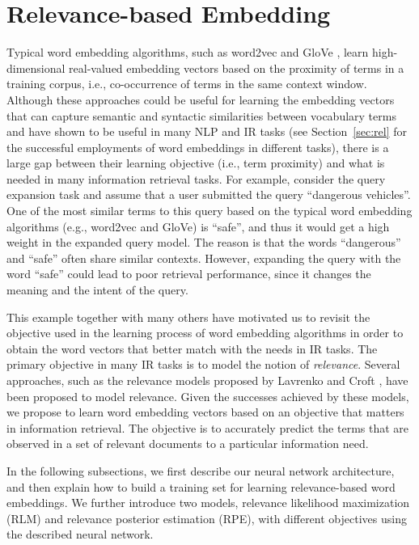 \documentclass[sigconf]{acmart}
\begin{document}
\vspace{-0.3cm}
\section{Relevance-based Embedding}
\label{sec:method}

Typical word embedding algorithms, such as word2vec \cite{Mikolov:2013} and GloVe \cite{Pennington:2014}, learn high-dimensional real-valued embedding vectors based on the proximity of terms in a training corpus, i.e., co-occurrence of terms in the same context window. Although these approaches could be useful for learning the embedding vectors that can capture semantic and syntactic similarities between vocabulary terms and have shown to be useful in many NLP and IR tasks (see Section~\ref{sec:rel} for the successful employments of word embeddings in different tasks), there is a large gap between their learning objective (i.e., term proximity) and what is needed in many information retrieval tasks. For example, consider the query expansion task and assume that a user submitted the query ``dangerous vehicles''. One of the most similar terms to this query based on the typical word embedding algorithms (e.g., word2vec and GloVe) is ``safe'', and thus it would get a high weight in the expanded query model. The reason is that the words ``dangerous'' and ``safe'' often share similar contexts. However, expanding the query with the word ``safe'' could lead to poor retrieval performance, since it changes the meaning and the intent of the query.

This example together with many others have motivated us to revisit the objective used in the learning process of word embedding algorithms in order to obtain the word vectors that better match with the needs in IR tasks. The primary objective in many IR tasks is to model the notion of \textit{relevance}. Several approaches, such as the relevance models proposed by Lavrenko and Croft \cite{Lavrenko:2001}, have been proposed to model relevance. Given the successes achieved by these models, we propose to learn word embedding vectors based on an objective that matters in information retrieval. The objective is to accurately predict the terms that are observed in a set of relevant documents to a particular information need. 

In the following subsections, we first describe our neural network architecture, and then explain how to build a training set for learning relevance-based word embeddings. We further introduce two models, relevance likelihood maximization (RLM) and relevance posterior estimation (RPE), with different objectives using the described neural network.
\end{document}
